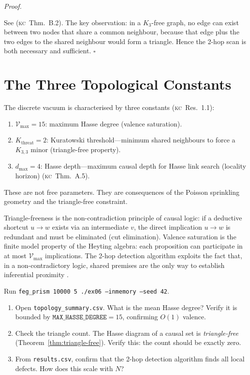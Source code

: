 \documentclass[11pt, a4paper, openany]{book}
\newcommand{\KC}[1]{\textnormal{(\textsc{kc}~#1)}}
\newcounter{thm}[chapter]
\renewenvironment{proof}[1][Proof]{%
  \par\noindent\textit{#1.}\quad
}{\hfill$\square$\par\medskip}
\begin{document}
\begin{proof}
See \KC{Thm.~B.2}. The key observation: in a $K_3$-free graph, no edge
can exist between two nodes that share a common neighbour, because that
edge plus the two edges to the shared neighbour would form a triangle.
Hence the 2-hop scan is both necessary and sufficient.
\end{proof}

\section{The Three Topological Constants}

\begin{result}[title={The Topological Constants}]
The discrete vacuum is characterised by three constants \KC{Res.~1.1}:
\begin{enumerate}
  \item $\mathcal{V}_{\max} = 15$: maximum Hasse degree (valence saturation).
  \item $K_{\mathrm{threat}} = 2$: Kuratowski threshold---minimum shared
    neighbours to force a $K_{3,3}$ minor (triangle-free property).
  \item $d_{\max} = 4$: Hasse depth---maximum causal depth for Hasse link
    search (locality horizon) \KC{Thm.~A.5}.
\end{enumerate}
These are not free parameters. They are consequences of the Poisson
sprinkling geometry and the triangle-free constraint.
\end{result}

\begin{logicalreading}
Triangle-freeness is the non-contradiction principle of causal logic: if
a deductive shortcut $u \to w$ exists via an intermediate $v$, the direct
implication $u \to w$ is redundant and must be eliminated (cut
elimination). Valence saturation is the finite model property of the
Heyting algebra: each proposition can participate in at most $\mathcal{V}_{\max}$
implications. The 2-hop detection algorithm exploits the fact that, in a
non-contradictory logic, shared premises are the only way to establish
inferential proximity \cite{stone1936}.
\end{logicalreading}


\begin{simulation}
Run \texttt{feg\_prism 10000 5 ./ex06 --inmemory --seed 42}.
\begin{enumerate}
\item Open \texttt{topology\_summary.csv}. What is the mean Hasse degree? Verify it is bounded by $\texttt{MAX\_HASSE\_DEGREE} = 15$, confirming $O(1)$ valence.
\item Check the triangle count. The Hasse diagram of a causal set is \emph{triangle-free} (Theorem~\ref{thm:triangle-free}). Verify this: the count should be exactly zero.
\item From \texttt{results.csv}, confirm that the 2-hop detection algorithm finds all local defects. How does this scale with $N$?
\end{enumerate}
\end{simulation}
\end{document}
